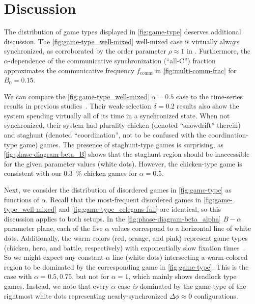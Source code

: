 \documentclass[pdflatex,lineno,referee,sn-nature]{sn-jnl}
\begin{document}
\section{Discussion}\label{sec:discussion}

The distribution of game types displayed in \cref{fig:game-type}
deserves additional discussion.
The \cref{fig:game-type_well-mixed} well-mixed case
is virtually always synchronized,
as corroborated by the order parameter $\rho \approx 1$ in
.
Furthermore,
the $\alpha$-dependence of the
communicative synchronization (``all-C'') fraction
approximates the communicative frequency $f_{\text{comm}}$
in \cref{fig:multi-comm-frac} for $B_0=0.15$.

We can compare the \cref{fig:game-type_well-mixed}
$\alpha = 0.5$ case
to the time-series results
in previous studies~\citep{tripp2022evolutionary}.
Their weak-selection $\delta = 0.2$
results also show the system spending
virtually all of its time in a synchronized state.
When not synchronized, their system had plurality
chicken (denoted ``snowdrift'' therein)
and staghunt (denoted ``coordination'',
not to be confused with the coordination-type game) games.
The presence of staghunt-type games is surprising,
as \cref{fig:phase-diagram-beta_B}
shows that the staghunt region should be inaccessible
for the given parameter values (white dots).
However, the chicken-type game is consistent with our
\SI{0.3}{\percent} chicken games for $\alpha = 0.5$.

Next, we consider the distribution of disordered games
in \cref{fig:game-type} as functions of $\alpha$.
Recall that the most-frequent disordered games
in \cref{fig:game-type_well-mixed}
and \cref{fig:game-type_celegans-full} are identical,
so this discussion applies to both setups.
In the \cref{fig:phase-diagram-beta_alpha}
$B-\alpha$ parameter plane,
each of the five $\alpha$ values
correspond to a horizontal line of white dots.
Additionally, the warm colors (red, orange, and pink)
represent game types (chicken, hero, and battle, respectively)
with exponentially slow fixation times~\citep{antal2006fixation}.
So we might expect any constant-$\alpha$ line (white dots) intersecting
a warm-colored region
to be dominated by the corresponding game in \cref{fig:game-type}.
This is the case with $\alpha = 0.5, 0.75$,
but not for $\alpha = 1$,
which mainly shows deadlock type games.
Instead, we note that every $\alpha$ case \emph{is} dominated
by the game-type of the rightmost white dots
representing nearly-synchronized $\Delta \phi \approx 0$ configurations.
\end{document}
